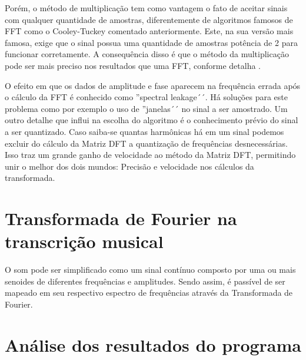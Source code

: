 \documentclass[brazil,times]{abnt}
\begin{document}
		Porém, o método de multiplicação tem como vantagem o fato de aceitar sinais com qualquer quantidade de amostras, diferentemente de algoritmos famosos de FFT como o Cooley-Tuckey comentado anteriormente. Este, na sua versão mais famosa, exige que o sinal possua uma quantidade de amostras potência de 2 para funcionar corretamente. A consequência disso é que o método da multiplicação pode ser mais preciso nos resultados que uma FFT, conforme detalha \cite{voltech:dft-vs-fft}.
		
		O efeito em que os dados de amplitude e fase aparecem na frequência errada após o cálculo da FFT é conhecido como ''spectral leakage´´. Há soluções para este problema como por exemplo o uso de ''janelas´´ no sinal a ser amostrado. Um outro detalhe que influi na escolha do algoritmo é o conhecimento prévio do sinal a ser quantizado. Caso saiba-se quantas harmônicas há em um sinal podemos excluir do cálculo da Matriz DFT a quantização de frequências desnecessárias. Isso traz um grande ganho de velocidade ao método da Matriz DFT, permitindo unir o melhor dos dois mundos: Precisão e velocidade nos cálculos da transformada.
	

\section*{Transformada de Fourier na transcrição musical}
	O som pode ser simplificado como um sinal contínuo composto por uma ou mais senoides de diferentes frequências e amplitudes. Sendo assim, é passível de ser mapeado em seu respectivo espectro de frequências através da Transformada de Fourier.




\section*{Análise dos resultados do programa}

\end{document}
